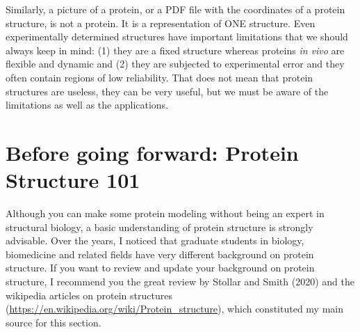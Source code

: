 \documentclass[
  letterpaper,
  DIV=11,
  numbers=noendperiod]{scrreprt}
\begin{document}
Similarly, a picture of a protein, or a PDF file with the coordinates of
a protein structure, is not a protein. It is a representation of ONE
structure. Even experimentally determined structures have important
limitations that we should always keep in mind: (1) they are a fixed
structure whereas proteins \emph{in vivo} are flexible and dynamic and
(2) they are subjected to experimental error and they often contain
regions of low reliability. That does not mean that protein structures
are useless, they can be very useful, but we must be aware of the
limitations as well as the applications.

\hypertarget{before-going-forward-protein-structure-101}{%
\chapter{Before going forward: Protein Structure
101}\label{before-going-forward-protein-structure-101}}

Although you can make some protein modeling without being an expert in
structural biology, a basic understanding of protein structure is
strongly advisable. Over the years, I noticed that graduate students in
biology, biomedicine and related fields have very different background
on protein structure. If you want to review and update your background
on protein structure, I recommend you the great review by Stollar and
Smith (2020) and the wikipedia articles on protein structures
(\url{https://en.wikipedia.org/wiki/Protein_structure}), which
constituted my main source for this section.
\end{document}
